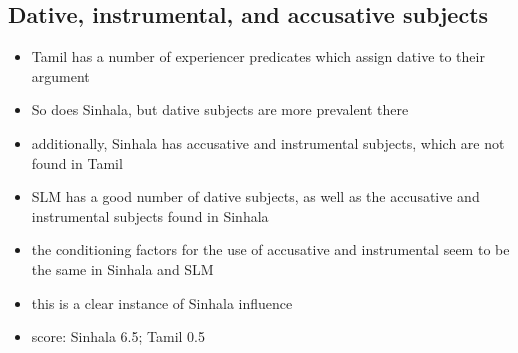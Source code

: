 \documentclass[a4paper,12pt]{article}
\begin{document}
\subsection{Dative, instrumental, and accusative subjects}
\begin{itemize}
 \item Tamil has a number of experiencer predicates which assign dative to their argument
 \item So does Sinhala, but dative subjects are more prevalent there
 \item additionally, Sinhala has accusative and instrumental subjects, which are not found in Tamil




 \item SLM has a good number of dative subjects, as well as the accusative and instrumental subjects found in Sinhala






 \item the conditioning factors for the use of accusative and instrumental seem to be the same in Sinhala and SLM
 \item this is a clear instance of Sinhala influence
 \item score: Sinhala 6.5; Tamil 0.5
\end{itemize}
\end{document}
